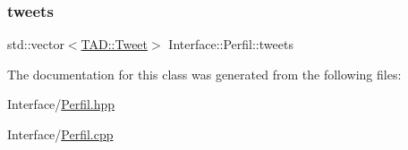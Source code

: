 \mbox{\label{class_interface_1_1_perfil_a8804eb352da38c2eaa101ca4a0a41f34}} 
\subsubsection{\texorpdfstring{tweets}{tweets}}
{\footnotesize\ttfamily std\+::vector$<$\hyperlink{class_t_a_d_1_1_tweet}{T\+A\+D\+::\+Tweet}$>$ Interface\+::\+Perfil\+::tweets\hspace{0.3cm}{\ttfamily [private]}}



The documentation for this class was generated from the following files\+:\begin{DoxyCompactItemize}
\item 
Interface/\hyperlink{_perfil_8hpp}{Perfil.\+hpp}\item 
Interface/\hyperlink{_perfil_8cpp}{Perfil.\+cpp}\end{DoxyCompactItemize}
